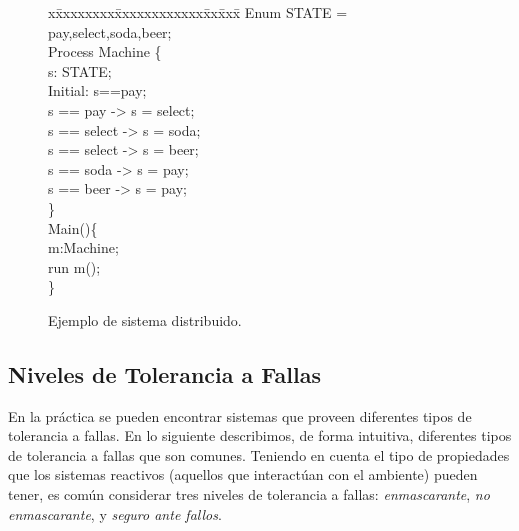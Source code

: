 \begin{figure}[t]
\begin{minipage}[t]{.47\textwidth}
\fontsize{6.6}{6.6}\selectfont\ttfamily
\begin{tabbing}
x\=xxxxxxxx\=xxxxxxxxxxxx\=xx\=xxx\= \kill
Enum STATE = {pay,select,soda,beer}; \\[1ex]

Process Machine \{\\[1ex]
\>s: STATE; \\
\>Initial: s==pay;\\[1ex]

\>[insertCoin] s == pay -> s = select; \\
\>[choose] s == select -> s = soda; \\
\>[choose] s == select -> s = beer; \\
\>[getSoda] s == soda -> s = pay; \\
\>[getBeer] s == beer -> s = pay; \\
\} \\[1ex]

Main()\{\\[1ex]
\>m:Machine; \\
\>run m(); \\
\}\\
\end{tabbing}
\end{minipage}
\hfill
\vspace{-0.5cm}
\caption{Ejemplo de sistema distribuido.} \label{fig:exam_language2}
\vspace{-0.5cm}
\end{figure}
\fi



\subsection{Niveles de Tolerancia a Fallas}
En la práctica se pueden encontrar sistemas que proveen diferentes tipos de tolerancia a fallas. En lo siguiente describimos, de forma intuitiva, diferentes tipos de tolerancia a fallas que son comunes. Teniendo en cuenta el tipo de propiedades que los sistemas reactivos (aquellos que interactúan con el ambiente) pueden tener, es común considerar tres niveles de tolerancia a fallas: \emph{enmascarante}, \emph{no enmascarante}, y \emph{seguro ante fallos}.

